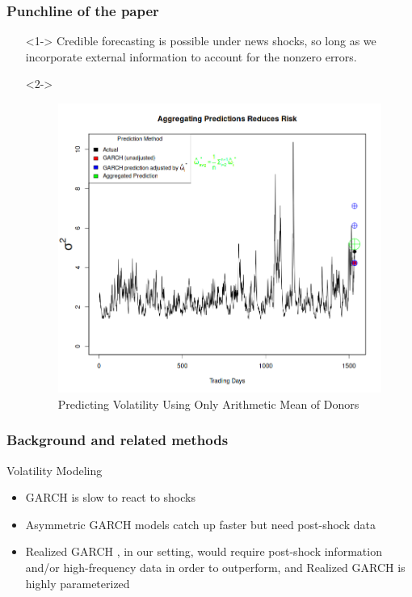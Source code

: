 \documentclass[9pt]{beamer}
\theoremstyle{definition}
\begin{document}
\begin{frame}
\frametitle{Punchline of the paper}

\begin{itemize}
    \item[] <1-> Credible forecasting is possible under news shocks, so long as we incorporate external information to account for the nonzero errors.
    \item[] <2-> \begin{figure}[H]
        \begin{center}
          \includegraphics[scale=.3]{simulation_plots/alternative_USE_in_paper_simulation_plot_arithmetic_mean.png}
          \caption{Predicting Volatility Using Only Arithmetic Mean of Donors}
          \end{center}
        \end{figure}
\end{itemize}
\end{frame}


\begin{frame}
    \frametitle{Background and related methods}
    Volatility Modeling

    \begin{itemize}
        \item GARCH is slow to react to shocks \parencite[][]{andersen2003modeling}
        \item Asymmetric GARCH models catch up faster but need post-shock data
        \item Realized GARCH \parencite[][]{hansen2012realized}, in our setting, would require post-shock information and/or high-frequency data in order to outperform, and Realized GARCH is highly parameterized
    \end{itemize}
\end{frame}
\end{document}
